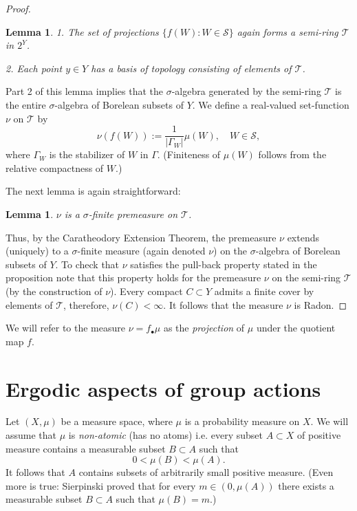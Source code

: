 \documentclass[12pt]{amsbook}%
\newtheorem{lem}[thm]{Lemma}
\theoremstyle{definition}
\theoremstyle{remark}
\numberwithin{section}{chapter}
\numberwithin{subsection}{section}
\numberwithin{figure}{chapter}
\def\cS{{\mathscr{S}}}
\def\cT{{\mathscr{T}}}
\def\Ga{\Gamma}
\begin{document}
{{\begin{proof}
\begin{lem}
1. The set of projections $\{f(W): W\in \cS\}$ again forms a semi-ring $\cT$ in $2^Y$.  

2. Each point $y\in Y$ has a basis of topology consisting of elements of $\cT$. 
\end{lem}

Part 2 of this lemma implies that the $\sigma$-algebra generated by the semi-ring   $\cT$ is the 
entire $\sigma$-algebra of Borelean subsets of $Y$. We define a real-valued set-function $\nu$ on $\cT$ by 
$$
\nu(f(W)):= \frac{1}{|\Ga_W|}\mu(W), \quad W\in \cS,$$
where $\Ga_W$ is the stabilizer of $W$ in $\Ga$. (Finiteness of $\mu(W)$ follows from the relative compactness of $W$.) 

The next lemma is again straightforward:

\begin{lem}
$\nu$ is a $\sigma$-finite premeasure on $\cT$. 
\end{lem}

Thus, by the Caratheodory Extension Theorem, the   premeasure $\nu$ extends (uniquely) to a $\sigma$-finite measure (again denoted $\nu$) on the $\sigma$-algebra of 
Borelean subsets of $Y$. To check that $\nu$ satisfies the pull-back property stated in the proposition note that this property holds for the premeasure $\nu$ on the 
semi-ring $\cT$ (by the construction of $\nu$). Every compact $C\subset Y$ admits a finite cover by elements of $\cT$, therefore, $\nu(C)<\infty$. 
It follows that the measure $\nu$ is Radon. 
\end{proof}

\medskip 
We will refer to the measure $\nu=f_\bullet \mu$ as the {\em projection} of $\mu$ under the quotient map $f$. 

\section{Ergodic aspects of group actions}


Let $(X,\mu)$ be a  measure space, where $\mu$ is a probability measure on $X$.  
We will assume that $\mu$ is {\em non-atomic} (has no atoms) i.e. every subset $A\subset X$ of positive measure contains a measurable subset $B\subset A$ such that 
$$
0< \mu(B)< \mu(A). 
$$ 
It follows that $A$ contains subsets of arbitrarily small positive measure. (Even more is true: Sierpinski proved that for every $m\in (0, \mu(A))$ there exists 
a measurable subset $B\subset A$ such that $\mu(B)=m$.) 


}}
\end{document}
